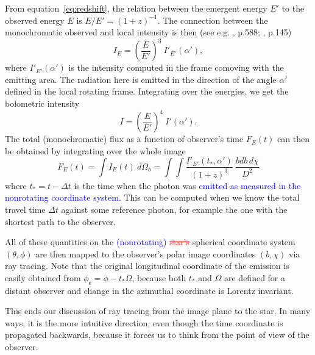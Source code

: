 \documentclass{aa}
\newcommand{\be}{\begin{equation}}
\newcommand{\ee}{\end{equation}}
\newcommand{\refe}[1]{\textcolor{blue}{{#1}}}
\newcommand{\refedel}[1]{\textcolor{red}{\sout{#1}}}
\begin{document}
From equation~\eqref{eq:redshift}, the relation between the emergent energy $E'$ to the observed energy $E$ is $E/E' = (1 + z)^{-1}$.
The connection between the monochromatic observed and local intensity is then (see e.g. \citealt{MTW73}, p.588; \citealt{RL79}, p.145)
\be
I_E = \left( \frac{E}{E'} \right)^3 ~I'_{E'}(\alpha'),
\ee
where $I'_{E'}(\alpha')$ is the intensity computed in the frame comoving with the emitting area.
The radiation here is emitted in the direction of the angle $\alpha'$ defined in the local rotating frame.
Integrating over the energies, we get the bolometric intensity
\be
I = \left(\frac{E}{E'} \right)^4 ~I'(\alpha').
\ee
The total (monochromatic) flux as a function of observer's time $F_E(t)$ can then be obtained by integrating over the whole image
\be\label{eq:fluxint}
F_E(t) = \int I_{E}(t) ~d\Omega_o = \int\int \frac{I'_{E'}(t_*, \alpha')}{(1+z)^3}  ~\frac{bdb \, d\chi}{D^2}
\ee
where $t_* = t - \Delta t$ is the time when the photon was \refe{emitted as measured in the nonrotating coordinate system.}
This can be computed when we know the total travel time $\Delta t$ against some reference photon, for example the one with the shortest path to the observer.

All of these quantities on the \refe{(nonrotating)} \refedel{star's} spherical coordinate system $(\theta, \phi)$ are then mapped to the observer's polar image coordinates $(b, \chi)$ via ray tracing.
Note that the original longitudinal coordinate of the emission is easily obtained from $\phi_{\mathrm{e}} = \phi - t_* \Omega$, because both $t_*$ and $\Omega$ are defined for a distant observer and change in the azimuthal coordinate is Lorentz invariant.

This ends our discussion of ray tracing from the image plane to the star.
In many ways, it is the more intuitive direction, even though the time coordinate is propagated backwards, because it forces us to think from the point of view of the observer.
\end{document}
